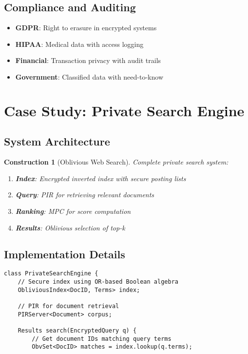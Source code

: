\documentclass[11pt,final,hidelinks]{article}
\newtheorem{construction}[theorem]{Construction}
\begin{document}
{\subsection{Compliance and Auditing}

\begin{itemize}
    \item \textbf{GDPR}: Right to erasure in encrypted systems
    \item \textbf{HIPAA}: Medical data with access logging
    \item \textbf{Financial}: Transaction privacy with audit trails
    \item \textbf{Government}: Classified data with need-to-know
\end{itemize}

\section{Case Study: Private Search Engine}

\subsection{System Architecture}

\begin{construction}[Oblivious Web Search]
Complete private search system:
\begin{enumerate}
    \item \textbf{Index}: Encrypted inverted index with secure posting lists
    \item \textbf{Query}: PIR for retrieving relevant documents
    \item \textbf{Ranking}: MPC for score computation
    \item \textbf{Results}: Oblivious selection of top-k
\end{enumerate}
\end{construction}

\subsection{Implementation Details}

\begin{verbatim}
class PrivateSearchEngine {
    // Secure index using OR-based Boolean algebra
    ObliviousIndex<DocID, Terms> index;
    
    // PIR for document retrieval
    PIRServer<Document> corpus;
    
    Results search(EncryptedQuery q) {
        // Get document IDs matching query terms
        ObvSet<DocID> matches = index.lookup(q.terms);
        

\end{verbatim}}
\end{document}
